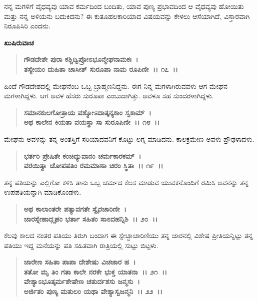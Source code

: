 ನನ್ನ ಮಗಳಿಗೆ ವೈಧವ್ಯವು ಯಾವ ಕರ್ಮದಿಂದ ಬಂದಿತು, ಯಾವ ಪುಣ್ಯ ಪ್ರಭಾವದಿಂದ ಆ ವೈಧವ್ಯವು ಹೋಯಿತು ಮತ್ತು ನನ್ನ ಅಳಿಯನು ಬದುಕಿದನು? ಈ ಕುತೂಹಲಕಾರಿಯಾದ ವಿಷಯವನ್ನು ಕೇಳಲು ಆಸೆಯಾಗಿದೆ, ವಿಸ್ತಾರವಾಗಿ ನಿರೂಪಿಸಿರಿ ಎಂದನು.

\newpage

\begin{flushleft}
\textbf{ಖುಷಿರುವಾಚ}
\end{flushleft}

\begin{verse}
\textbf{ಗೌಡದೇಶೇ ಪುರಾ ಕಶ್ಚಿದ್ವಿಪ್ರೋಽಭೂನ್ಮೇಘನಾಮಕಃ~।}\\\textbf{ತಸ್ಯೇಯಂ ದುಹಿತಾ ಚಾಸೀತ್ ಸುರೂಪಾ ನಾಮ ರೂಪಿಣೀ~।। ೧೭~।।}
\end{verse}

ಹಿಂದೆ ಗೌಡದೇಶದಲ್ಲಿ ಮೇಘನೆಂಬ ಒಬ್ಬ ಬ್ರಾಹ್ಮಣನಿದ್ದನು. ಈಗ ನಿನ್ನ ಮಗಳಾಗಿರುವವಳು ಆಗ ಮೇಘನ ಮಗಳಾಗಿದ್ದಳು. ಆಗ ಅವಳ ಹೆಸರು ಸುರೂಪಾ ಎಂಬುದಾಗಿತ್ತು. ಅವಳೂ ಸಹ ಸುಂದರಳಾಗಿದ್ದಳು.

\begin{verse}
\textbf{ಸಮಾನಕುಲಗೋತ್ರಾಯ ವಶ್ಯೋಽದಾತ್ಕನ್ಯಕಾಂ ಸ್ವಕಾಮ್~।}\\\textbf{ಅಥ ಕಾಲೇನ ಕಿಯತಾ ವಯಸ್ಥಾ ಸಾ ಸುರೂಪಿಣೀ~।। ೧೮~।।}
\end{verse}

ಮೇಘನು ಅವಳನ್ನು ತನ್ನ ಅಂತಸ್ತಿಗೆ ಸರಿಯಾದವನಿಗೆ ಕೊಟ್ಟು ಲಗ್ನ ಮಾಡಿದನು. ಕಾಲಕ್ರಮೇಣ ಅವಳು ಪ್ರೌಢಳಾದಳು.

\begin{verse}
\textbf{ಭರ್ತರಿ ಪ್ರೇಷಿತೇ ಕಂಚಿದ್ಯುವಾನಂ ಚರ್ಮಕಾರಕಮ್~।}\\\textbf{ವರಯಿತ್ವಾ ಚೋಪಪತಿಂ ರಮಮಾಣಾ ಚಿರಂ ಸ್ಥಿತಾ~।। ೧೯~।।}
\end{verse}

ತನ್ನ ಪತಿಯನ್ನು ಎಲ್ಲಿಗೋ ಕಳಿಸಿ ತಾನು ಒಬ್ಬ ಚರ್ಮದ ಕೆಲಸ ಮಾಡುವ ಯುವಕ\-ನೊಂದಿಗೆ ರಮಿಸಿ ಅವನನ್ನು ತನ್ನ ಉಪಪತಿಯನ್ನಾಗಿ ಮಾಡಿಕೊಂಡಳು.

\begin{verse}
\textbf{ಅಥ ಕಾಲಾಂತರೇ ಪತ್ಯಾವಗತೇ ಸ್ವೈರಚಾರಿಣೀ~।}\\\textbf{ಜಾರಸ್ನೇಹಾದ್ಗೃಹಂ ಭರ್ತಾ ಸಹಿತಂ ಸಾಽದಹನ್ನಿಶಿ~।। ೨೦~।।}
\end{verse}

ಕೆಲವು ಕಾಲದ ನಂತರ ಪತಿಯು ತಿರುಗಿ ಬಂದಾಗ ಈ ಸ್ಪೇಚ್ಛಾಚಾರಿಣಿಯು ತನ್ನ ಜಾರನಲ್ಲಿ ವಿಶೇಷ ಪ್ರೀತಿಯನ್ನಿಟ್ಟು ತನ್ನ ಪತಿಯು ಇದ್ದ ಮನೆಯನ್ನು ಪತಿ ಸಹಿತವಾಗಿ ರಾತ್ರಿಯಲ್ಲಿ ಸುಟ್ಟು ಬಿಟ್ಟಳು.

\begin{verse}
\textbf{ಜಾರೇಣ ಸಹಿತಾ ಪಾಪಾ ದೇಶೇಷು ವಿಚಚಾರ ಹ~।}\\\textbf{ತತೋ ಮೃ ತಿಂ ಗತಾ ಕಾಲೇ ನರಕೇ ಭುಕ್ತ ಯಾತನಾ~।। ೨೧~।। }\\\textbf{ವೇಶ್ಯಾಽಭೂತ್ಕರ್ಮಶೇಷೇಣ ಚತುರ್ದಶಸು ಜನ್ಮಸು~।} \\\textbf{ಅರ್ಜಿತಂ ಪುಣ್ಯ ಮತುಲಂ ಯಥಾ ವೇಶ್ಯಾಸ್ವಜನ್ಮನಿ~।। ೨೨~।।}
\end{verse}


